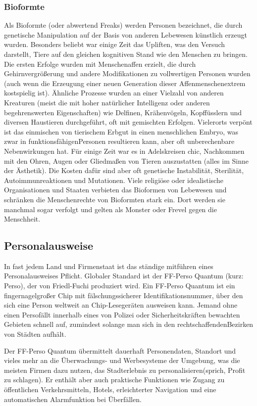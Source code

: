 \subsubsection{Bioformte}
Als Bioformte (oder abwertend \glqq Freaks\grqq) werden Personen bezeichnet, die durch genetische Manipulation auf der Basis von anderen Lebewesen künstlich erzeugt wurden. Besonders beliebt war einige Zeit das \glqq Upliften\grqq, was den Versuch darstellt, Tiere auf den gleichen kognitiven Stand wie den Menschen zu bringen. Die ersten Erfolge wurden mit Menschenaffen erzielt, die durch Gehirnvergrößerung und andere Modifikationen zu vollwertigen Personen wurden (auch wenn die Erzeugung einer neuen Generation dieser \glqq Affenmenschen\grqq extrem kostspielig ist). Ähnliche Prozesse wurden an einer Vielzahl von anderen Kreaturen (meist die mit hoher natürlicher Intelligenz oder anderen begehrenswerten Eigenschaften) wie Delfinen, Krähenvögeln, Kopffüsslern und diversen Haustieren durchgeführt, oft mit gemischten Erfolgen. Vielerorts verpönt ist das einmischen von tierischem Erbgut in einen menschlichen Embryo, was zwar in \glqq funktionsfähigen\grqq  Personen resultieren kann, aber oft unberechenbare Nebenwirkungen hat. Für einige Zeit war es in Adelskreisen \glqq chic\grqq , Nachkommen mit den Ohren, Augen oder Gliedmaßen von Tieren auszustatten (alles im Sinne der Ästhetik). Die Kosten dafür sind aber oft genetische Instabilität, Sterilität, Autoimmunreaktionen und Mutationen.
Viele religiöse oder idealistische Organisationen und Staaten verbieten das Bioformen von Lebewesen und schränken die Menschenrechte von Bioformten stark ein. Dort werden sie manchmal sogar verfolgt und gelten als Monster oder Frevel gegen die Menschheit.

\subsection{Personalausweise}
In fast jedem Land und Firmenstaat ist das ständige mitführen eines Personalausweises Pflicht. Globaler Standard ist der FF-Perso Quantum (kurz: Perso), der von Friedl-Fuchi produziert wird. Ein FF-Perso Quantum ist ein fingernagelgroßer Chip mit fälschungssicherer Identifikationsnummer, über den sich eine Person weltweit an Chip-Lesegeräten ausweisen kann. Jemand ohne einen \glqq Perso\grqq fällt innerhalb eines von Polizei oder Sicherheitskräften bewachten Gebieten schnell auf, zumindest solange man sich in den \glqq rechtschaffenden\grqq Bezirken von Städten aufhält.

Der FF-Perso Quantum übermittelt dauerhaft Personendaten, Standort und vieles mehr an die Überwachungs- und Werbesysteme der Umgebung, was die meisten Firmen dazu nutzen, das Stadterlebnis zu \glqq personalisieren\grqq (sprich, Profit zu schlagen). Er enthält aber auch praktische Funktionen wie Zugang zu öffentlichen Verkehrsmitteln, Hotels, erleichterter Navigation und eine automatischen Alarmfunktion bei Überfällen.

